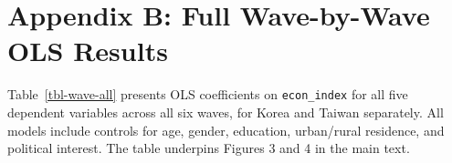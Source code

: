 \documentclass[
  12pt,
  letterpaper]{article}
\begin{document}
\begin{table}

\caption{\label{tbl-desc-tw}Taiwan: wave-level index means (normalized
0--1, SE in parentheses)}


\end{table}%

\section{Appendix B: Full Wave-by-Wave OLS
Results}\label{appendix-b-full-wave-by-wave-ols-results}

Table~\ref{tbl-wave-all} presents OLS coefficients on
\texttt{econ\_index} for all five dependent variables across all six
waves, for Korea and Taiwan separately. All models include controls for
age, gender, education, urban/rural residence, and political interest.
The table underpins Figures 3 and 4 in the main text.
\end{document}
